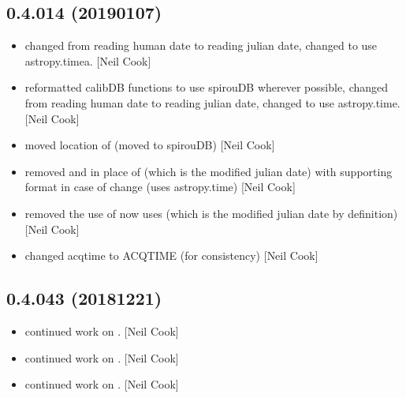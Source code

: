 \documentclass[a4paper,10pt,english]{report}
\begin{document}
\subsection{0.4.014 (2019\sphinxhyphen{}01\sphinxhyphen{}07)}
\label{\detokenize{misc/changelog:id241}}\begin{itemize}
\item {} 
 \sphinxhyphen{} changed from reading human date to reading julian date,
changed to use astropy.timea. {[}Neil Cook{]}

\item {} 
 \sphinxhyphen{} reformatted calibDB functions to use spirouDB wherever
possible, changed from reading human date to reading julian date,
changed to use astropy.time. {[}Neil Cook{]}

\item {} 
 \sphinxhyphen{} moved location of  (moved to
spirouDB) {[}Neil Cook{]}

\item {} 
 \sphinxhyphen{} removed  and  in
place of  (which is the modified julian date) \sphinxhyphen{} with
supporting format in case of change (uses astropy.time) {[}Neil Cook{]}

\item {} 
 \sphinxhyphen{} removed the use of  now uses
 (which is the modified julian date by definition) {[}Neil
Cook{]}

\item {} 
 \sphinxhyphen{} changed acqtime to ACQTIME (for
consistency) {[}Neil Cook{]}

\end{itemize}


\subsection{0.4.043 (2018\sphinxhyphen{}12\sphinxhyphen{}21)}
\label{\detokenize{misc/changelog:id242}}\begin{itemize}
\item {} 
 \sphinxhyphen{} continued work on . {[}Neil Cook{]}

\item {} 
 \sphinxhyphen{} continued work on . {[}Neil Cook{]}

\item {} 
 \sphinxhyphen{} continued work on . {[}Neil Cook{]}

\end{itemize}
\end{document}
